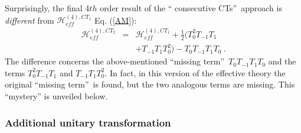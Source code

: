 \documentclass[floatfix,twocolumn,aps,prb,showpacs,superscriptaddress]{revtex4}
\def\tzero{T_0}
\begin{document}
Surprisingly, the final 4$th$ order result of the \textquotedblleft
consecutive CTs\textquotedblright\ approach is \textit{different} from $%
\mathcal{H}_{eff}^{(4),CT_{1}}$ Eq. (\ref{AM}):
\begin{eqnarray}
\mathcal{H}_{eff}^{(4),CT_{2}} &=&\mathcal{H}_{eff}^{(4),CT_{1}}+\frac{1}{2}%
(\tzero^2T_{-1}T_{1}  \label{H_CUT} \\
&&+T_{-1}T_{1}\tzero^2)-T_{0}T_{-1}T_{1}T_{0}\ .  \nonumber
\end{eqnarray}%
The difference concerns the above-mentioned \textquotedblleft missing
term\textquotedblright\ $T_{0}T_{-1}T_{1}T_{0}$ and the terms $%
\tzero^2T_{-1}T_{1}$ and $T_{-1}T_{1}\tzero^2$.
In fact, in this version of the effective theory the original
\textquotedblleft missing term\textquotedblright\ is found, but the two
analogous terms are missing. This ``mystery'' is unveiled below.




\subsubsection{Additional unitary transformation}
\end{document}

